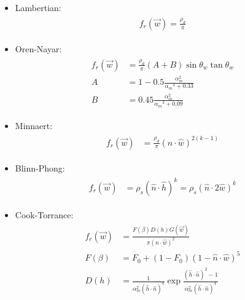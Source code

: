 \begin{itemize}
    \item Lambertian: 
    \begin{gather}
        \label{eq:lambert_brdf}
        \begin{aligned}
            f_{r}(\vec{w}) = \frac{\rho_{d}}{\pi}
        \end{aligned}
    \end{gather}
    \item Oren-Nayar: 
    \begin{gather}
        \label{eq:oren_nayar_brdf}
        \begin{aligned}
            f_{r}(\vec{w}) &= \frac{\rho_{d}}{\pi}(A + B)\sin{\theta_{w}} \tan{\theta_{w}}\\
            A &= 1 - 0.5 \frac{{\alpha_{m}^{2}}}{{\alpha_{m}}^2 + 0.33}\\
            B &= 0.45 \frac{{\alpha_{m}^{2}}}{{\alpha_{m}}^2 + 0.09}
        \end{aligned}
    \end{gather}
    \item Minnaert:
    \begin{gather}
        \label{eq:minnaert_brdf}
        \begin{aligned}
            f_{r}(\vec{w}) &= \frac{\rho_{d}}{\pi}(\hat{n} \cdot \hat{w})^{2(k-1)}
        \end{aligned}
    \end{gather}
    \item Blinn-Phong: 
    \begin{gather}
        \label{eq:blinn_phong_brdf}
        \begin{aligned}
            f_{r}(\vec{w}) &= \rho_{s}(\hat{n} \cdot \hat{h})^{k} = \rho_{s}(\hat{n} \cdot 2\hat{w})^{k}
        \end{aligned}
    \end{gather}
    \item Cook-Torrance: 
    \begin{gather}
        \label{eq:cook_torrance_brdf}
        \begin{aligned}
            f_{r}(\vec{w}) &= \frac{F(\beta)D(h)G(\vec{w})}{\pi (\hat{n} \cdot \hat{w})^{2}}\\
            F(\beta) &= F_{0} + (1 - F_{0}) (1 - \hat{n} \cdot \hat{w})^{5}\\
            D(h) &= \frac{1}{\alpha^{2}_{m} (\hat{h} \cdot \hat{n})^{4}} \exp{\frac{(\hat{h} \cdot \hat{n})^{2} - 1}{\alpha^{2}_{m}(\hat{h} \cdot \hat{n})^{4}}}\\

\end{aligned}
\end{gather}
\end{itemize}
